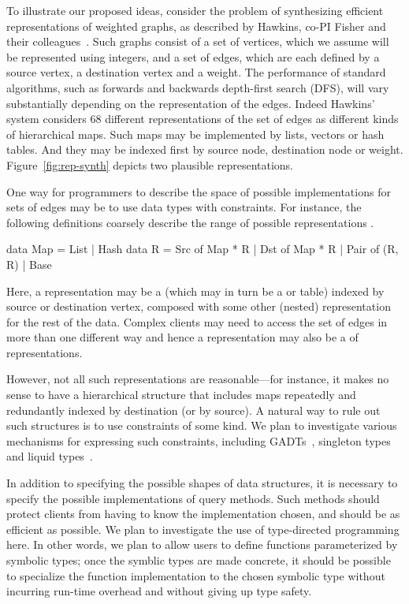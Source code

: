 To illustrate our proposed ideas, consider the problem of synthesizing
efficient representations of weighted graphs, as described by Hawkins,
co-PI Fisher and their colleagues~\cite{data-rep-synth}.  Such graphs
consist of a set of vertices, which we assume will be represented
using integers, and a set of edges, which are each defined by a source
vertex, a destination vertex and a weight.  The performance of
standard algorithms, such as forwards and backwards depth-first search
(DFS), will vary substantially depending on the representation of the
edges.  Indeed Hawkins' system considers 68 different representations
of the set of edges as different kinds of hierarchical maps.  Such
maps may be implemented by lists, vectors or hash tables.  And they
may be indexed first by source node, destination node or weight.
Figure~\ref{fig:rep-synth} depicts two plausible
representations.

One way for programmers to describe the space of possible
implementations for sets of edges may be to use data types with
constraints.  For instance, the following definitions coarsely
describe the range of possible representations .

\begin{mylisting}
data Map = List | Hash
data R = Src of Map * R | Dst of Map * R | Pair of (R, R) | Base
\end{mylisting}

Here, a representation  may be a  (which may in turn
be a  or  table) indexed by source
or destination vertex, composed with some other (nested) representation
for the rest of the data.  Complex clients may need to access the set of
edges in more than one different way and hence a representation may also
be a  of representations.

However, not all such representations are reasonable---for instance,
it makes no sense to have a hierarchical structure that includes
maps repeatedly and redundantly indexed by destination (or by source).
A natural way to rule out such structures is to use constraints of
some kind.  We plan to investigate various mechanisms for
expressing such constraints, including GADTs~\cite{gadts},
singleton types~\cite{weirich:singletons} and
liquid types~\cite{liquid-haskell}.

In addition to specifying the possible shapes of data structures,
it is necessary to specify the possible implementations of query
methods.  Such methods should protect clients from having to know
the implementation chosen, and should be as efficient as possible.
We plan to investigate the use of type-directed programming here.
In other words, we plan to allow users to define functions parameterized
by symbolic types; once the symblic types are made concrete, it should
be possible to specialize the function implementation to the chosen
symbolic type without incurring run-time overhead and without giving up
type safety.


